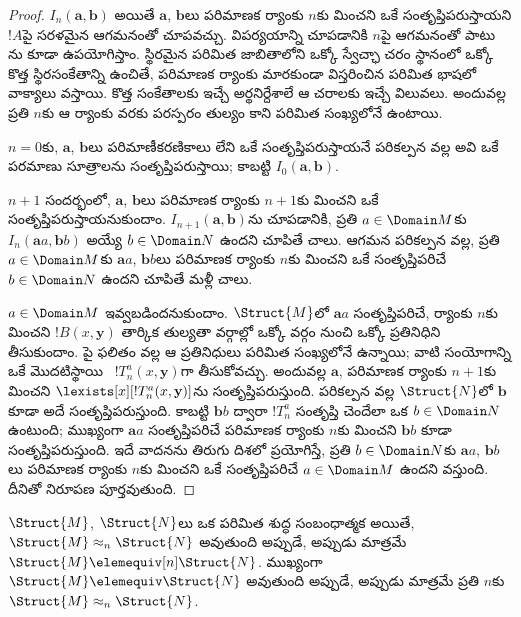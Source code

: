 \documentclass[../../../include/open-logic-section]{subfiles}
\begin{document}
\begin{proof}
  $I_n(\mathbf{a},\mathbf{b})$ అయితే $\mathbf{a}$, $\mathbf{b}$లు
  పరిమాణక ర్యాంకు $n$కు మించని ఒకే
   సంతృప్తిపరుస్తాయని $!A$పై సరళమైన
  ఆగమనంతో చూపవచ్చు. విపర్యయాన్ని చూపడానికి $n$పై ఆగమనంతో పాటు
  ను కూడా ఉపయోగిస్తాం. స్థిరమైన పరిమిత జాబితాలోని
  ఒక్కో స్వేచ్ఛా చరం స్థానంలో ఒక్కో కొత్త స్థిరసంకేతాన్ని ఉంచితే,
  పరిమాణక ర్యాంకు మారకుండా విస్తరించిన పరిమిత భాషలో వాక్యాలు వస్తాయి.
  కొత్త సంకేతాలకు ఇచ్చే అర్థనిర్దేశాలే ఆ చరాలకు ఇచ్చే విలువలు.
  అందువల్ల ప్రతి $n$కు ఆ ర్యాంకు వరకు పరస్పరం తుల్యం కాని
   పరిమిత సంఖ్యలోనే ఉంటాయి.

  $n=0$కు, $\mathbf{a}$, $\mathbf{b}$లు పరిమాణీకరణికాలు లేని ఒకే
   సంతృప్తిపరుస్తాయనే పరికల్పన వల్ల అవి
  ఒకే పరమాణు సూత్రాలను సంతృప్తిపరుస్తాయి; కాబట్టి
  $I_0(\mathbf{a},\mathbf{b})$.

  $n+1$ సందర్భంలో, $\mathbf{a}$, $\mathbf{b}$లు పరిమాణక ర్యాంకు
  $n+1$కు మించని ఒకే 
  సంతృప్తిపరుస్తాయనుకుందాం. $I_{n+1}(\mathbf{a},\mathbf{b})$ను
  చూపడానికి, ప్రతి $a\in\Domain M$కు
  $I_n(\mathbf{a}a,\mathbf{b}b)$ అయ్యే $b\in\Domain N$ ఉందని చూపితే
  చాలు. ఆగమన పరికల్పన వల్ల, ప్రతి $a\in\Domain M$కు
  $\mathbf{a}a$, $\mathbf{b}b$లు పరిమాణక ర్యాంకు $n$కు మించని ఒకే
   సంతృప్తిపరిచే $b\in\Domain N$ ఉందని
  చూపితే మళ్లీ చాలు.

  $a\in\Domain M$ ఇవ్వబడిందనుకుందాం. $\Struct{M}$లో
  $\mathbf{a}a$ సంతృప్తిపరిచే, ర్యాంకు $n$కు మించని
  $!B(x,\mathbf{y})$  తార్కిక తుల్యతా వర్గాల్లో
  ఒక్కో వర్గం నుంచి ఒక్కో ప్రతినిధిని తీసుకుందాం. పై ఫలితం వల్ల ఆ ప్రతినిధులు పరిమిత
  సంఖ్యలోనే ఉన్నాయి; వాటి సంయోగాన్ని ఒకే మొదటిస్థాయి
  ~$!T^a_n(x,\mathbf{y})$గా తీసుకోవచ్చు.
  అందువల్ల $\mathbf{a}$, పరిమాణక ర్యాంకు $n+1$కు మించని
  $\lexists[x][!T^a_n(x,\mathbf{y})]$ను సంతృప్తిపరుస్తుంది.
  పరికల్పన వల్ల $\Struct{N}$లో $\mathbf{b}$ కూడా అదే
   సంతృప్తిపరుస్తుంది. కాబట్టి
  $\mathbf{b}b$ ద్వారా $!T^a_n$ సంతృప్తి చెందేలా ఒక $b\in\Domain N$ ఉంటుంది;
  ముఖ్యంగా $\mathbf{a}a$ సంతృప్తిపరిచే పరిమాణక ర్యాంకు $n$కు
  మించని  $\mathbf{b}b$ కూడా సంతృప్తిపరుస్తుంది.
  ఇదే వాదనను తిరుగు దిశలో ప్రయోగిస్తే, ప్రతి $b\in\Domain N$కు
  $\mathbf{a}a$, $\mathbf{b}b$లు పరిమాణక ర్యాంకు $n$కు మించని ఒకే
   సంతృప్తిపరిచే $a\in\Domain M$ ఉందని
  వస్తుంది. దీనితో నిరూపణ పూర్తవుతుంది.
\end{proof}

\begin{cor}
  $\Struct{M}$, $\Struct{N}$లు ఒక పరిమిత 
  శుద్ధ సంబంధాత్మక  అయితే,
  $\Struct{M}\approx_n\Struct{N}$ అవుతుంది అప్పుడే, అప్పుడు మాత్రమే
  $\Struct{M}\elemequiv[n]\Struct{N}$. ముఖ్యంగా
  $\Struct{M}\elemequiv\Struct{N}$ అవుతుంది అప్పుడే, అప్పుడు మాత్రమే ప్రతి $n$కు
  $\Struct{M}\approx_n\Struct{N}$.
\end{cor}
\end{document}
